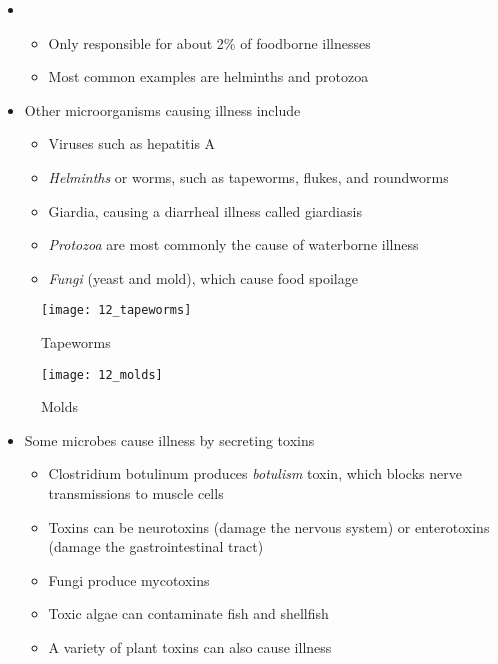\documentclass[title={Chapter 12}]{fdsn201notes}
\begin{document}
\begin{itemize}
	\item {}
	\begin{itemize}
		\item Only responsible for about 2\% of foodborne illnesses
		\item Most common examples are helminths and protozoa
	\end{itemize}
	\item Other microorganisms causing illness include
	\begin{itemize}
		\item Viruses such as hepatitis A
		\item \emph{Helminths} or worms, such as tapeworms, flukes, and roundworms
		\item Giardia, causing a diarrheal illness called giardiasis
		\item \emph{Protozoa} are most commonly the cause of waterborne illness
		\item \emph{Fungi} (yeast and mold), which cause food spoilage
	\end{itemize}
\end{itemize}

\begin{figure}[H]
	\centering
	\texttt{[image: 12\_tapeworms]}
	\caption{Tapeworms}
	\label{fig:tapeworms}
\end{figure}

\begin{figure}[H]
	\centering
	\texttt{[image: 12\_molds]}
	\caption{Molds}
	\label{fig:molds}
\end{figure}

\begin{itemize}
	\item Some microbes cause illness by secreting toxins
	\begin{itemize}
		\item Clostridium botulinum produces \emph{botulism} toxin, which blocks nerve transmissions to muscle cells
		\item Toxins can be neurotoxins (damage the nervous system) or enterotoxins (damage the gastrointestinal tract)
		\item Fungi produce mycotoxins
		\item Toxic algae can contaminate fish and shellfish
		\item A variety of plant toxins can also cause illness
	\end{itemize}
\end{itemize}
\end{document}
